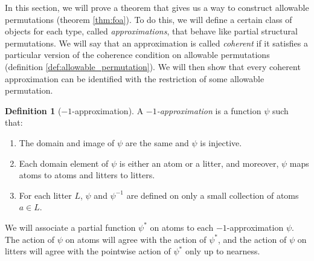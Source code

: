 \documentclass{article}
\theoremstyle{definition}
\newtheorem{definition}[theorem]{Definition}
\theoremstyle{remark}
\begin{document}
In this section, we will prove a theorem that gives us a way to construct allowable permutations (theorem \ref{thm:foa}).
To do this, we will define a certain class of objects for each type, called {\em approximations\/}, that behave like partial structural permutations.
We will say that an approximation is called {\em coherent\/} if it satisfies a particular version of the coherence condition on allowable permutations (definition \ref{def:allowable_permutation}).
We will then show that every coherent approximation can be identified with the restriction of some allowable permutation.

\begin{definition}[$-1$-approximation]\label{def:base_approx}
  A {\em $-1$-approximation\/} is a function $\psi$ such that:
  \begin{enumerate}
    \item The domain and image of $\psi$ are the same and $\psi$ is injective.
    \item Each domain element of $\psi$ is either an atom or a litter, and moreover, $\psi$ maps atoms to atoms and litters to litters.
    \item For each litter $L$, $\psi$ and $\psi^{-1}$ are defined on only a small collection of atoms $a \in L$.
  \end{enumerate}
\end{definition}
We will associate a partial function $\psi^*$ on atoms to each $-1$-approximation $\psi$.
The action of $\psi$ on atoms will agree with the action of $\psi^*$, and the action of $\psi$ on litters will agree with the pointwise action of $\psi^*$ only up to nearness.
\end{document}
